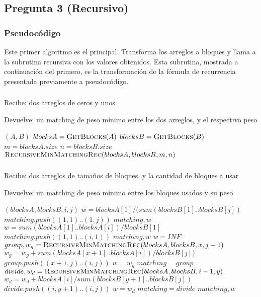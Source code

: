 \subsection*{Pregunta 3 (Recursivo)}
\subsubsection*{Pseudocódigo}
Este primer algoritmo es el principal. Transforma los arreglos a bloques y llama a la subrutina recursiva con los valores obtenidos. Esta subrutina, mostrada a continuación del primero, es la transformación de la fórmula de recurrencia presentada previamente a pseudocódigo.
\subsubsection*{}
Recibe: dos arreglos de ceros y unos

Devuelve: un matching de peso mínimo entre los dos arreglos, y el respectivo peso
\begin{algorithmic}[1]
  $(A,B)$
  \STATE $blocksA = \textsc{GetBlocks$(A)$}$
  \STATE $blocksB = \textsc{GetBlocks$(B)$}$
  \STATE $m = blocksA.size$
  \STATE $n = blocksB.size$
  \RETURN $\textsc{RecursiveMinMatchingRec$(blocksA,blocksB,m,n)$}$
\end{algorithmic}
\subsubsection*{}
Recibe: dos arreglos de tamaños de bloques, y la cantidad de bloques a usar

Devuelve: un matching de peso mínimo entre los bloques usados y su peso
\begin{algorithmic}[1]
  $(blocksA,blocksB,i,j)$
    \STATE $w=blocksA[1]/(sum(blocksB[1]..blocksB[j])$
    \STATE $matching.push((1,1)..(1,j))$
    \RETURN $matching,w$
  \ENDIF
    \STATE $w=sum(blocksA[1]..blocksA[i])/blocksB[1]$
    \STATE $matching.push((1,1)..(i,1))$
    \RETURN $matching,w$
  \ENDIF
    \STATE $w = INF$
        \STATE $group,w_g=\textsc{RecursiveMinMatchingRec$(blocksA, blocksB, x,j-1)$}$
        \STATE $w_g = w_g +sum(blocksA[x+1]..blocksA[i])/blocksB[j])$
        \STATE $group.push((x+1,j)..(i,j))$
            \STATE $w = w_g$
            \STATE $matching = group$
        \ENDIF
    \ENDFOR
        \STATE $divide,w_d=\textsc{RecursiveMinMatchingRec$(blocksA, blocksB, i-1, y)$}$
        \STATE $w_d = w_d + blocksA[i]/sum(blocksB[y+1]..blocksB[j])$
        \STATE $divide.push((i,y+1)..(i,j))$
            \STATE $w = w_d$
            \STATE $matching = divide$
        \ENDIF
    \ENDFOR
    \RETURN $matching,w$
\end{algorithmic}
